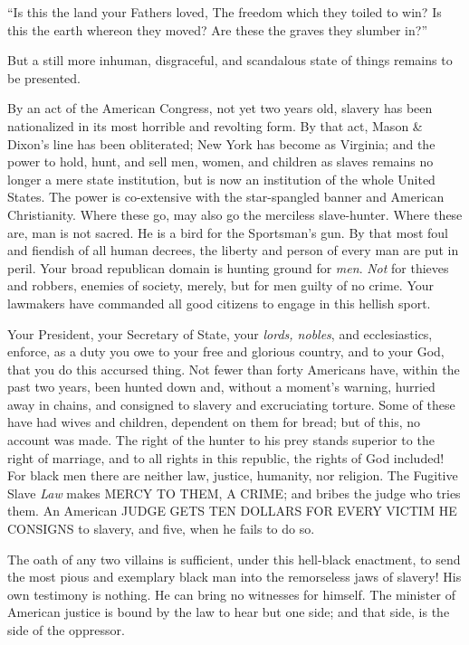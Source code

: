 “Is this the land your Fathers loved, The freedom which they toiled to win? Is this the earth whereon they moved? Are these the graves they slumber in?”\par

But a still more inhuman, disgraceful, and scandalous state of things remains to be presented.\par

By an act of the American Congress, not yet two years old, slavery has been nationalized in its most horrible and revolting form. By that act, Mason \& Dixon’s line has been obliterated; New York has become as Virginia; and the power to hold, hunt, and sell men, women, and children as slaves remains no longer a mere state institution, but is now an institution of the whole United States. The power is co-extensive with the star-spangled banner and American Christianity. Where these go, may also go the merciless slave-hunter. Where these are, man is not sacred. He is a bird for the Sportsman’s gun. By that most foul and fiendish of all human decrees, the liberty and person of every man are put in peril. Your broad republican domain is hunting ground for \textit{men}. \textit{Not} for thieves and robbers, enemies of society, merely, but for men guilty of no crime. Your lawmakers have commanded all good citizens to engage in this hellish sport.\par

Your President, your Secretary of State, your \textit{lords, nobles}, and ecclesiastics, enforce, as a duty you owe to your free and glorious country, and to your God, that you do this accursed thing. Not fewer than forty Americans have, within the past two years, been hunted down and, without a moment’s warning, hurried away in chains, and consigned to slavery and excruciating torture. Some of these have had wives and children, dependent on them for bread; but of this, no account was made. The right of the hunter to his prey stands superior to the right of marriage, and to all rights in this republic, the rights of God included! For black men there are neither law, justice, humanity, nor religion. The Fugitive Slave \textit{Law} makes MERCY TO THEM, A CRIME; and bribes the judge who tries them. An American JUDGE GETS TEN DOLLARS FOR EVERY VICTIM HE CONSIGNS to slavery, and five, when he fails to do so.\par

The oath of any two villains is sufficient, under this hell-black enactment, to send the most pious and exemplary black man into the remorseless jaws of slavery! His own testimony is nothing. He can bring no witnesses for himself. The minister of American justice is bound by the law to hear but one side; and that side, is the side of the oppressor.\par

